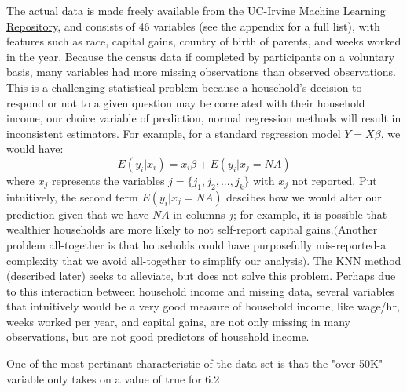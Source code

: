 \documentclass[11pt]{article}
\begin{document}
The actual data is made freely available from 
\href{http://archive.ics.uci.edu/ml/datasets/Census-Income+%28KDD%29}{the UC-Irvine Machine Learning Repository}, and consists of 46 variables (see the appendix for a full list), with features such as race, capital gains, country of birth of parents, and weeks worked in the year. Because the census data if completed by participants on a voluntary basis, many variables had more missing observations than observed observations.  This is a challenging statistical problem because a household's decision to respond or not to a given question may be correlated with their household income, our choice variable of prediction, normal regression methods will result in inconsistent estimators. For example, for a standard regression model $Y = X\beta$, we would have: 
\begin{equation}
E(y_i|x_i) = x_i \beta + E(y_i | x_j = NA)
\end{equation}
where $x_j$ represents the variables $j = \{j_1, j_2,...,j_k\}$ with $x_j$ not reported. Put intuitively, the second term $E(y_i | x_j = NA)$ descibes how we would alter our prediction given that we have $NA$ in columns $j$; for example, it is possible that wealthier households are more likely to not self-report capital gains.$($Another problem all-together is that households could have purposefully mis-reported-a complexity that we avoid all-together to simplify our analysis$)$. The KNN method (described later) seeks to alleviate, but does not solve this problem. Perhaps due to this interaction between household income and missing data, several variables that intuitively would be a very good measure of household income, like wage/hr, weeks worked per year, and capital gains, are not only missing in many observations, but are not good predictors of household income. 

One of the most pertinant characteristic of the data set is that the "over 50K" variable only takes on a value of true for 6.2%
\end{document}
